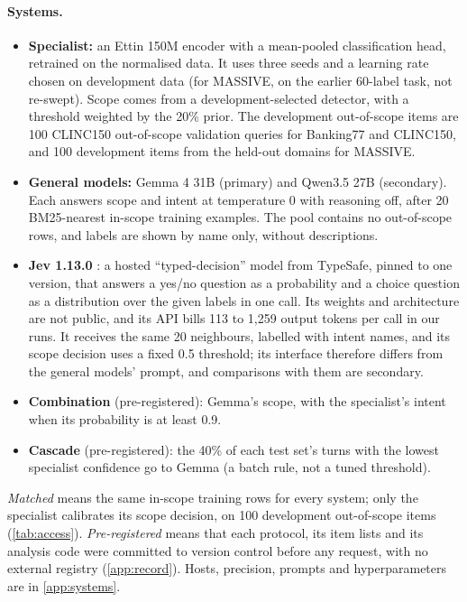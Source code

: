 \documentclass[11pt]{article}
\begin{document}
\paragraph{Systems.}
\begin{itemize}
  \item \textbf{Specialist:} an Ettin 150M encoder \citep{weller2026ettin} with a mean-pooled classification head, retrained on the normalised data. It uses three seeds and a learning rate chosen on development data (for MASSIVE, on the earlier 60-label task, not re-swept). Scope comes from a development-selected detector, with a threshold weighted by the 20\% prior. The development out-of-scope items are 100 CLINC150 out-of-scope validation queries for Banking77 and CLINC150, and 100 development items from the held-out domains for MASSIVE.
  \item \textbf{General models:} Gemma 4 31B (primary) and Qwen3.5 27B (secondary). Each answers scope and intent at temperature 0 with reasoning off, after 20 BM25-nearest \citep{robertson2009bm25} in-scope training examples. The pool contains no out-of-scope rows, and labels are shown by name only, without descriptions.
  \item \textbf{Jev 1.13.0} \citep{deusser2026jev}: a hosted ``typed-decision'' model from TypeSafe, pinned to one version, that answers a yes/no question as a probability and a choice question as a distribution over the given labels in one call. Its weights and architecture are not public, and its API bills 113 to 1,259 output tokens per call in our runs. It receives the same 20 neighbours, labelled with intent names, and its scope decision uses a fixed 0.5 threshold; its interface therefore differs from the general models' prompt, and comparisons with them are secondary.
  \item \textbf{Combination} (pre-registered): Gemma's scope, with the specialist's intent when its probability is at least 0.9.
  \item \textbf{Cascade} (pre-registered): the 40\% of each test set's turns with the lowest specialist confidence go to Gemma (a batch rule, not a tuned threshold).
\end{itemize}
\emph{Matched} means the same in-scope training rows for every system; only the specialist calibrates its scope decision, on 100 development out-of-scope items (\cref{tab:access}). \emph{Pre-registered} means that each protocol, its item lists and its analysis code were committed to version control before any request, with no external registry (\cref{app:record}). Hosts, precision, prompts and hyperparameters are in \cref{app:systems}.
\end{document}
